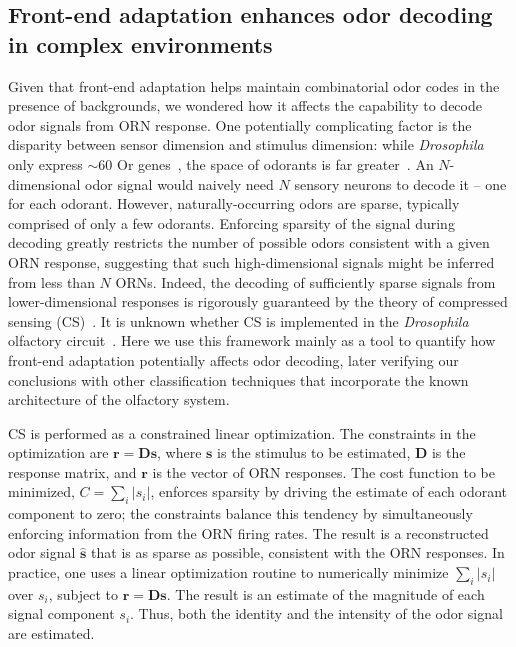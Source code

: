 \documentclass[9pt,lineno]{elife}
\begin{document}
\subsection{Front-end adaptation enhances odor decoding in complex environments}

{\color{blue} Given that front-end adaptation helps maintain combinatorial odor codes in the presence of backgrounds, we wondered how it affects the capability to decode odor signals from ORN response.} %
One potentially complicating factor is the disparity between sensor dimension and stimulus dimension: while \textit{Drosophila} only express $\sim 60$ Or genes~\citep{olfactory_sensory_map}, the space of odorants is far greater~\citep{vijay_1}. An $N$-dimensional odor signal would naively need $N$ sensory neurons to decode it -- one for each odorant. However, naturally-occurring odors are sparse, typically comprised of only a few odorants. Enforcing sparsity of the signal during decoding greatly restricts the number of possible odors consistent with a given ORN response, suggesting that such high-dimensional signals might be inferred from less than $N$ ORNs. Indeed, the decoding of sufficiently sparse signals from lower-dimensional responses is rigorously guaranteed by the theory of compressed sensing (CS)~\citep{CS_donoho, CS_tao}. It is unknown whether CS is implemented in the \textit{Drosophila} olfactory circuit~\citep{chlovskii_pevlavan}. Here we use this framework mainly as a tool to quantify how front-end adaptation potentially affects odor decoding, later verifying our conclusions with other classification techniques that incorporate the known architecture of the olfactory system. 

CS is performed as a constrained linear optimization. The constraints in the optimization are $\mathbf r = \mathbf D \mathbf s$, where $\mathbf s$ is the stimulus to be estimated, $\mathbf D$ is the response matrix, and $\mathbf r$ is the vector of ORN responses. The cost function to be minimized, $C = \sum_i |s_i|$, enforces sparsity by driving the estimate of each odorant component to zero; the constraints balance this tendency by simultaneously enforcing information from the ORN firing rates. The result is a reconstructed odor signal $\hat {\mathbf s}$ that is as sparse as possible, consistent with the ORN responses. {\color{blue}  In practice, one uses a linear optimization routine  to numerically minimize $\sum_i |s_i|$  over $s_i$, subject to $\mathbf r = \mathbf D \mathbf s$. The result is an estimate of the magnitude of each signal component $s_i$. Thus, both the identity and the intensity of the odor signal are estimated.  }
\end{document}
